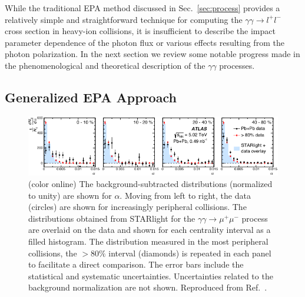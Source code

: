 \documentclass[twocolumn,epjc3]{svjour3}\sloppy
\begin{document}
While the traditional EPA method discussed in Sec.~\ref{sec:process} provides a relatively simple and straightforward technique for computing the $\gamma\gamma \rightarrow l^+l^-$ cross section in heavy-ion collisions, it is insufficient to describe the impact parameter dependence of the photon flux or various effects resulting from the photon polarization. In the next section we review some notable progress made in the phenomenological and theoretical description of the $\gamma\gamma$ processes.

\subsection{Generalized EPA Approach}

\begin{figure}
    \centering
      \includegraphics[width=.99\linewidth]{fig/fig_13-crop.pdf}
 
    \caption{ (color online) The background-subtracted distributions (normalized to unity) are shown for $\alpha$. Moving from left to right, the data (circles) are shown for increasingly peripheral collisions. The distributions obtained from STARlight for the $\gamma\gamma \rightarrow \mu^+\mu^-$ process are overlaid on the data and shown for each centrality interval as a filled histogram. The distribution measured in the most peripheral collisions, the $> 80\%$ interval (diamonds) is repeated in each panel to facilitate a direct comparison. The error bars include the statistical and systematic uncertainties. Uncertainties related to the background normalization are not shown. Reproduced from Ref.~\cite{atlascollaborationObservationCentralityDependentAcoplanarity2018a}.
    }
    \label{fig:exp_atlas}
\end{figure}
\end{document}
